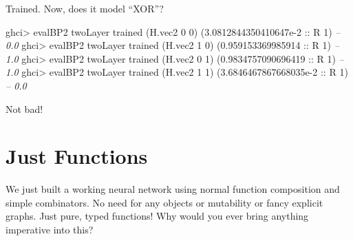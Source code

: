 \documentclass[]{article}
\newenvironment{Shaded}{}{}
\newcommand{\CommentTok}[1]{\textcolor[rgb]{0.38,0.63,0.69}{\textit{#1}}}
\newcommand{\DataTypeTok}[1]{\textcolor[rgb]{0.56,0.13,0.00}{#1}}
\newcommand{\DecValTok}[1]{\textcolor[rgb]{0.25,0.63,0.44}{#1}}
\newcommand{\FloatTok}[1]{\textcolor[rgb]{0.25,0.63,0.44}{#1}}
\newcommand{\FunctionTok}[1]{\textcolor[rgb]{0.02,0.16,0.49}{#1}}
\newcommand{\NormalTok}[1]{#1}
\newcommand{\OtherTok}[1]{\textcolor[rgb]{0.00,0.44,0.13}{#1}}
\begin{document}
\begin{Shaded}
\end{Shaded}

Trained. Now, does it model ``XOR''?

\begin{Shaded}
\begin{Highlighting}[]
\NormalTok{ghci}\FunctionTok{>}\NormalTok{ evalBP2 twoLayer trained (H.vec2 }\DecValTok{0} \DecValTok{0}\NormalTok{)}
\NormalTok{(}\FloatTok{3.0812844350410647e-2}\OtherTok{ ::} \DataTypeTok{R} \DecValTok{1}\NormalTok{)          }\CommentTok{-- 0.0}
\NormalTok{ghci}\FunctionTok{>}\NormalTok{ evalBP2 twoLayer trained (H.vec2 }\DecValTok{1} \DecValTok{0}\NormalTok{)}
\NormalTok{(}\FloatTok{0.959153369985914}\OtherTok{ ::} \DataTypeTok{R} \DecValTok{1}\NormalTok{)              }\CommentTok{-- 1.0}
\NormalTok{ghci}\FunctionTok{>}\NormalTok{ evalBP2 twoLayer trained (H.vec2 }\DecValTok{0} \DecValTok{1}\NormalTok{)}
\NormalTok{(}\FloatTok{0.9834757090696419}\OtherTok{ ::} \DataTypeTok{R} \DecValTok{1}\NormalTok{)             }\CommentTok{-- 1.0}
\NormalTok{ghci}\FunctionTok{>}\NormalTok{ evalBP2 twoLayer trained (H.vec2 }\DecValTok{1} \DecValTok{1}\NormalTok{)}
\NormalTok{(}\FloatTok{3.6846467867668035e-2}\OtherTok{ ::} \DataTypeTok{R} \DecValTok{1}\NormalTok{)          }\CommentTok{-- 0.0}
\end{Highlighting}
\end{Shaded}

Not bad!

\hypertarget{just-functions}{%
\section{Just Functions}\label{just-functions}}

We just built a working neural network using normal function composition and
simple combinators. No need for any objects or mutability or fancy explicit
graphs. Just pure, typed functions! Why would you ever bring anything imperative
into this?
\end{document}
